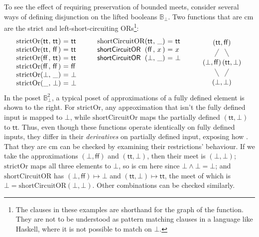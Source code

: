 \begin{example}
\label{ex:strict-short-circuit}
  To see the effect of requiring preservation of bounded meets,
  consider several ways of defining disjunction on the lifted booleans
  $\mathbb{B}_\bot$. Two functions that are cm are the strict and
  left-short-circuiting ORs\footnote{The clauses in these examples are
    shorthand for the graph of the function. They are not to be
    understood as pattern matching clauses in a language like Haskell,
    where it is not possible to match on $\bot$.}:
  \begin{displaymath}
    \begin{array}[t]{l@{(}l@{,~}l@{)~}c@{~}l}
      \mathrm{strictOr}&\mathsf{tt}&\mathsf{tt}&=&\mathsf{tt} \\
      \mathrm{strictOr}&\mathsf{tt}&\mathsf{ff}&=&\mathsf{tt} \\
      \mathrm{strictOr}&\mathsf{ff}&\mathsf{tt}&=&\mathsf{tt} \\
      \mathrm{strictOr}&\mathsf{ff}&\mathsf{ff}&=&\mathsf{ff} \\
      \mathrm{strictOr}&\bot&\_&=&\bot \\
      \mathrm{strictOr}&\_&\bot&=&\bot \\
    \end{array}
    \qquad
    \begin{array}[t]{l@{(}l@{,~}l@{)~}c@{~}l}
      \mathrm{shortCircuitOR}&\mathsf{tt}&\_&=&\mathsf{tt} \\
      \mathsf{shortCircuitOR}&\mathsf{ff}&x&=&x \\
      \mathsf{shortCircuitOR}&\bot&\_& =& \bot
    \end{array}
    \qquad
    \raisebox{-15ex}{
      \begin{tikzpicture}
        \node (top) at (0,0) {$(\mathsf{tt},\mathsf{ff})$};
        \node [below of=top,xshift=-0.5cm] (oi) {$(\bot,\mathsf{ff})$};
        \node [below of=top,xshift=0.5cm] (io) {$(\mathsf{tt},\bot)$};
        \node [below of=oi,xshift=0.5cm] (oo) {$(\bot,\bot)$};
        \draw (top) -- (oi);
        \draw (top) -- (io);
        \draw (oi) -- (oo);
        \draw (io) -- (oo);
      \end{tikzpicture}
    }
  \end{displaymath}
  In the poset $\mathbb{B}_\bot^2$, a typical poset of approximations of a fully defined element is shown to the right. For $\mathrm{strictOr}$, any approximation that isn't the fully defined input is mapped to $\bot$, while $\mathrm{shortCircuitOr}$ maps the partially defined $(\mathsf{tt},\bot)$ to $\mathsf{tt}$. Thus, even though these functions operate identically on fully defined inputs, they differ in their \emph{derivatives} on partially defined input, exposing how . That they are cm can be checked by examining their restrictions' behaviour. If we take the approximations $(\bot,\mathsf{ff})$ and $(\mathsf{tt},\bot)$, then their meet is $(\bot,\bot)$; $\mathrm{strictOr}$ maps all three elements to $\bot$, so is cm here since $\bot \wedge \bot = \bot$; and $\mathrm{shortCircuitOR}$ has $(\bot,\mathsf{ff}) \mapsto \bot$ and $(\mathsf{tt},\bot) \mapsto \mathsf{tt}$, the meet of which is $\bot = \mathrm{shortCircuitOR}(\bot,\bot)$. Other combinations can be checked similarly.

\end{example}
